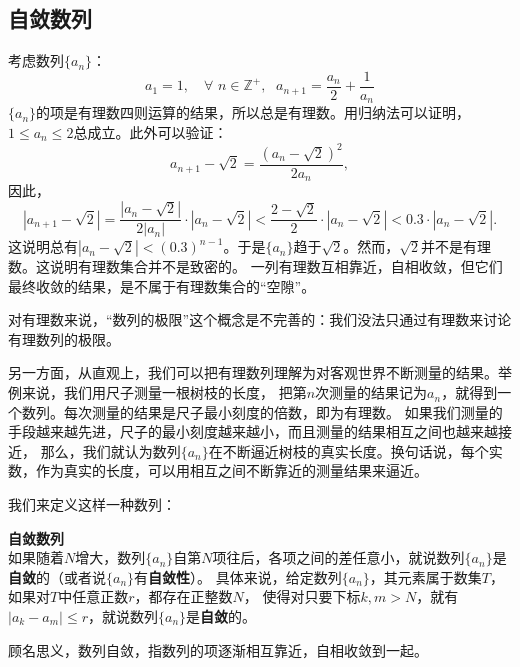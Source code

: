 \documentclass[12pt,UTF8]{ctexbook}
\begin{document}
\subsection{自敛数列}

考虑数列$\{a_n\}$：
$$ a_1 = 1, \quad \forall \,\, n \in \mathbb{Z}^+, \;\,\, a_{n+1} = \frac{a_n}{2} + \frac{1}{a_n} $$
$\{a_n\}$的项是有理数四则运算的结果，所以总是有理数。用归纳法可以证明，$1 \leqslant a_n \leqslant 2$总成立。此外可以验证：
$$ a_{n+1} - \sqrt{2} = \frac{(a_n - \sqrt{2})^2}{2a_n},$$
因此，
$$ |a_{n+1} - \sqrt{2}| = \frac{|a_n - \sqrt{2}|}{2|a_n|} \cdot |a_n - \sqrt{2}| < \frac{2 - \sqrt{2}}{2} \cdot |a_n - \sqrt{2}| < 0.3\cdot |a_n - \sqrt{2}|. $$
这说明总有$|a_n - \sqrt{2}| < (0.3)^{n-1}$。于是$\{a_n\}$趋于$\sqrt{2}$。然而，$\sqrt{2}$并不是有理数。这说明有理数集合并不是致密的。
一列有理数互相靠近，自相收敛，但它们最终收敛的结果，是不属于有理数集合的“空隙”。

对有理数来说，“数列的极限”这个概念是不完善的：我们没法只通过有理数来讨论有理数列的极限。

另一方面，从直观上，我们可以把有理数列理解为对客观世界不断测量的结果。举例来说，我们用尺子测量一根树枝的长度，
把第$n$次测量的结果记为$a_n$，就得到一个数列。每次测量的结果是尺子最小刻度的倍数，即为有理数。
如果我们测量的手段越来越先进，尺子的最小刻度越来越小，而且测量的结果相互之间也越来越接近，
那么，我们就认为数列$\{a_n\}$在不断逼近树枝的真实长度。换句话说，每个实数，作为真实的长度，可以用相互之间不断靠近的测量结果来逼近。

我们来定义这样一种数列：
\begin{df}\textbf{自敛数列}\\
    如果随着$N$增大，数列$\{a_n\}$自第$N$项往后，各项之间的差任意小，就说数列$\{a_n\}$是\textbf{自敛}的（或者说$\{a_n\}$有\textbf{自敛性}）。
    具体来说，给定数列$\{a_n\}$，其元素属于数集$T$，如果对$T$中任意正数$r$，都存在正整数$N$，
    使得对只要下标$k,m>N$，就有$|a_k - a_m| \leqslant r$，就说数列$\{a_n\}$是\textbf{自敛}的。
\end{df}

顾名思义，数列自敛，指数列的项逐渐相互靠近，自相收敛到一起。
\end{document}
